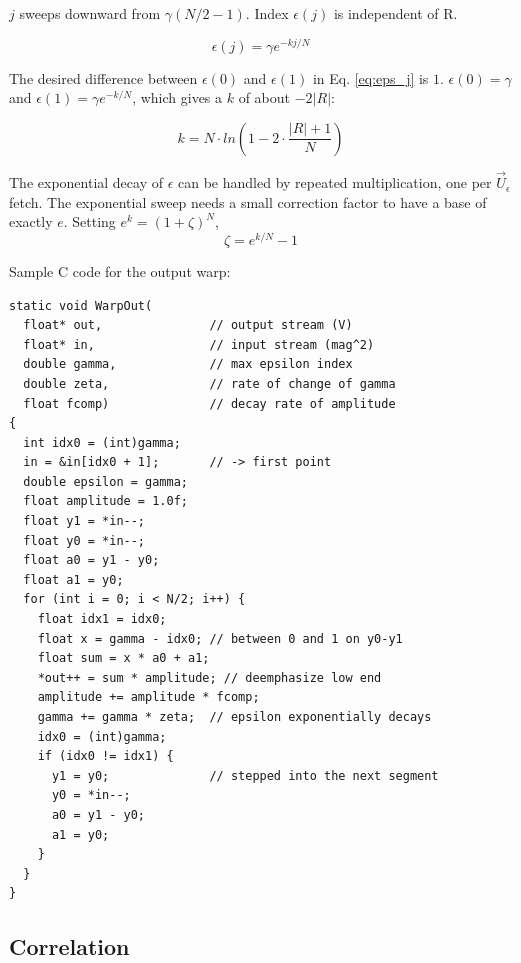 $j$ sweeps downward from $\gamma(N/2-1)$.
Index $\epsilon(j)$ is independent of R.

\begin{equation}  \label{eq:eps_j}
\epsilon(j) = \gamma e^{-kj/N}
\end{equation}

The desired difference between $\epsilon(0)$ and $\epsilon(1)$ in
Eq. \ref{eq:eps_j} is $1$. $\epsilon(0) = \gamma$
and $\epsilon(1) = \gamma e^{-k/N}$,
which gives a $k$ of about $-2|R|$:

\begin{equation}  \label{eq:k}
k = N \cdot ln \left(1 - 2 \cdot \frac{|R| + 1}{N} \right)
\end{equation}

The exponential decay of $\epsilon$ can be handled by repeated multiplication,
one per $\vec{U}_\epsilon$ fetch.
The exponential sweep needs a small correction factor to have a base of exactly
$e$.
Setting $e^{k} = (1 + \zeta)^{N}$,
\begin{equation}
\zeta = e^{k/N} - 1
\end{equation}

Sample C code for the output warp:

\begin{lstlisting}[float,floatplacement=H]
static void WarpOut(
  float* out,               // output stream (V)
  float* in,                // input stream (mag^2)
  double gamma,             // max epsilon index
  double zeta,              // rate of change of gamma
  float fcomp)              // decay rate of amplitude
{
  int idx0 = (int)gamma;
  in = &in[idx0 + 1];       // -> first point
  double epsilon = gamma;
  float amplitude = 1.0f;
  float y1 = *in--;
  float y0 = *in--;
  float a0 = y1 - y0;
  float a1 = y0;
  for (int i = 0; i < N/2; i++) {
    float idx1 = idx0;
    float x = gamma - idx0; // between 0 and 1 on y0-y1
    float sum = x * a0 + a1;
    *out++ = sum * amplitude; // deemphasize low end
    amplitude += amplitude * fcomp;
    gamma += gamma * zeta;  // epsilon exponentially decays
    idx0 = (int)gamma;
    if (idx0 != idx1) {
      y1 = y0;              // stepped into the next segment
      y0 = *in--;
      a0 = y1 - y0;
      a1 = y0;
    }
  }
}
\end{lstlisting}


\subsection{Correlation}

